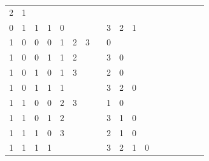 \begin{table}[htbp]
\begin{minipage}{.5\textwidth}
\begin{tabular}{cccccccccccccccccc}
			\multicolumn{1}{c}{2} & \multicolumn{1}{c}{1} & \multicolumn{1}{c}{}& \multicolumn{1}{c}{} \\
			\multicolumn{1}{c}{0} & \multicolumn{1}{c}{1} & \multicolumn{1}{c}{1} & \multicolumn{1}{c}{1} & \multicolumn{1}{|c}{0} & \multicolumn{1}{c}{} & \multicolumn{1}{c}{}& \multicolumn{1}{c}{} &
			\multicolumn{1}{c}{3} & \multicolumn{1}{c}{2} & \multicolumn{1}{c}{1}& \multicolumn{1}{c}{} \\
			\multicolumn{1}{c}{1} & \multicolumn{1}{c}{0} & \multicolumn{1}{c}{0} & \multicolumn{1}{c}{0} & \multicolumn{1}{|c}{1} & \multicolumn{1}{c}{2} & \multicolumn{1}{c}{3}& \multicolumn{1}{c}{} &
			\multicolumn{1}{c}{0} & \multicolumn{1}{c}{} & \multicolumn{1}{c}{}& \multicolumn{1}{c}{} \\
			\multicolumn{1}{c}{1} & \multicolumn{1}{c}{0} & \multicolumn{1}{c}{0} & \multicolumn{1}{c}{1} & \multicolumn{1}{|c}{1} & \multicolumn{1}{c}{2} & \multicolumn{1}{c}{}& \multicolumn{1}{c}{} &
			\multicolumn{1}{c}{3} & \multicolumn{1}{c}{0} & \multicolumn{1}{c}{}& \multicolumn{1}{c}{} \\
			\multicolumn{1}{c}{1} & \multicolumn{1}{c}{0} & \multicolumn{1}{c}{1} & \multicolumn{1}{c}{0} & \multicolumn{1}{|c}{1} & \multicolumn{1}{c}{3} & \multicolumn{1}{c}{}& \multicolumn{1}{c}{} &
			\multicolumn{1}{c}{2} & \multicolumn{1}{c}{0} & \multicolumn{1}{c}{}& \multicolumn{1}{c}{} \\
			\multicolumn{1}{c}{1} & \multicolumn{1}{c}{0} & \multicolumn{1}{c}{1} & \multicolumn{1}{c}{1} & \multicolumn{1}{|c}{1} & \multicolumn{1}{c}{} & \multicolumn{1}{c}{}& \multicolumn{1}{c}{} &
			\multicolumn{1}{c}{3} & \multicolumn{1}{c}{2} & \multicolumn{1}{c}{0}& \multicolumn{1}{c}{} \\
			\multicolumn{1}{c}{1} & \multicolumn{1}{c}{1} & \multicolumn{1}{c}{0} & \multicolumn{1}{c}{0} & \multicolumn{1}{|c}{2} & \multicolumn{1}{c}{3} & \multicolumn{1}{c}{}& \multicolumn{1}{c}{} &
			\multicolumn{1}{c}{1} & \multicolumn{1}{c}{0} & \multicolumn{1}{c}{}& \multicolumn{1}{c}{} \\
			\multicolumn{1}{c}{1} & \multicolumn{1}{c}{1} & \multicolumn{1}{c}{0} & \multicolumn{1}{c}{1} & \multicolumn{1}{|c}{2} & \multicolumn{1}{c}{} & \multicolumn{1}{c}{}& \multicolumn{1}{c}{} &
			\multicolumn{1}{c}{3} & \multicolumn{1}{c}{1} & \multicolumn{1}{c}{0}& \multicolumn{1}{c}{} \\
			\multicolumn{1}{c}{1} & \multicolumn{1}{c}{1} & \multicolumn{1}{c}{1} & \multicolumn{1}{c}{0} & \multicolumn{1}{|c}{3} & \multicolumn{1}{c}{} & \multicolumn{1}{c}{}& \multicolumn{1}{c}{} &
			\multicolumn{1}{c}{2} & \multicolumn{1}{c}{1} & \multicolumn{1}{c}{0}& \multicolumn{1}{c}{} \\
			\multicolumn{1}{c}{1} & \multicolumn{1}{c}{1} & \multicolumn{1}{c}{1} & \multicolumn{1}{c}{1} & \multicolumn{1}{|c}{} & \multicolumn{1}{c}{} & \multicolumn{1}{c}{}& \multicolumn{1}{c}{} &
			\multicolumn{1}{c}{3} & \multicolumn{1}{c}{2} & \multicolumn{1}{c}{1}& \multicolumn{1}{c}{0} \\
			

\end{tabular}
\end{minipage}
\end{table}

